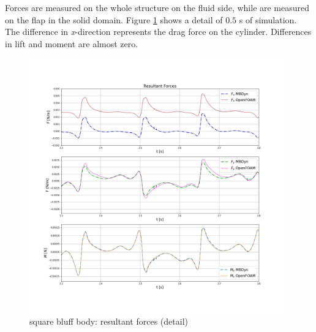 Forces are measured on the whole structure on the fluid side, while are measured on the flap in the solid domain. Figure \ref{fig:sq_force} shows a detail of $0.5$ \si{s} of simulation. The difference in \textit{x}-direction represents the drag force on the cylinder. Differences in lift and moment are almost zero. 

\begin{figure}[htbp!]
	\centering
	\includegraphics[width=0.98\textwidth, trim=20 100 20 100, clip]{images/sq-cyl/forces_sq.png}
	\caption{square bluff body: resultant forces (detail)}
	\label{fig:sq_force}
\end{figure}



